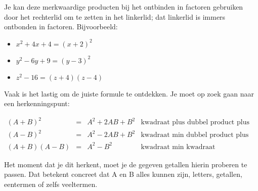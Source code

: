 Je kan deze merkwaardige producten bij het ontbinden in factoren gebruiken door het rechterlid om te zetten in het linkerlid; dat linkerlid is immers ontbonden in factoren. Bijvoorbeeld:

\begin{voorbeeld}
	\begin{itemize}
		\item $x^2+4x+4=(x+2)^2$
		\item $y^2-6y+9=(y-3)^2$
		\item $z^2-16=(z+4)(z-4)$
	\end{itemize}
\end{voorbeeld}

Vaak is het lastig om de juiste formule te ontdekken. Je moet op zoek gaan naar een herkenningspunt:

\begin{center}
	$\begin{array}{ccll}
	(A+B)^2 &=& A^2+2AB+B^2 & \text{kwadraat plus dubbel product plus kwadraat} \\
	(A-B)^2 &=& A^2-2AB+B^2 & \text{kwadraat min dubbel product plus kwadraat} \\
	(A+B)(A-B) &=& A^2-B^2 & \text{kwadraat min kwadraat}
	\end{array}$
\end{center}

Het moment dat je dit herkent, moet je de gegeven getallen hierin proberen te passen. Dat betekent concreet dat A en B alles kunnen zijn, letters, getallen, eentermen of zelfs veeltermen.

